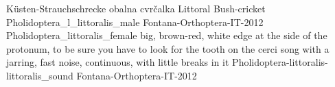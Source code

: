 {K\"usten-Strauchschrecke} %
{obalna cvr\v{c}alka} %
{Littoral Bush-cricket} %
{Pholidoptera_l_littoralis_male} {Fontana-Orthoptera-IT-2012} %
{Pholidoptera_littoralis_female} {} %
{big, brown-red, white edge at the side of the protonum, to be sure you have to look for the tooth on the cerci} %
{song with a jarring, fast noise, continuous, with little breaks in it} %
{Pholidoptera-littoralis-littoralis_sound} {Fontana-Orthoptera-IT-2012} %

